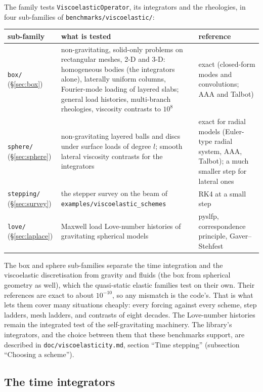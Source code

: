 \documentclass[11pt]{article}
\numberwithin{equation}{section}
\newcommand{\code}[1]{\texttt{#1}}
\begin{document}
The family tests \code{ViscoelasticOperator}, its integrators and the
rheologies, in four sub-families of \code{benchmarks/viscoelastic/}:
\begin{center}
\small
\begin{tabular}{@{}lP{8.2cm}P{4.2cm}@{}}
\toprule
sub-family & what is tested & reference \\
\midrule
\code{box/} (\S\ref{sec:box}) & non-gravitating, solid-only problems on
rectangular meshes, 2-D and 3-D: homogeneous bodies (the integrators
alone), laterally uniform columns, Fourier-mode loading of layered slabs;
general load histories, multi-branch rheologies, viscosity contrasts to
$10^8$ & exact (closed-form modes and convolutions; AAA and Talbot) \\
\code{sphere/} (\S\ref{sec:sphere}) & non-gravitating layered balls and
discs under surface loads of degree $l$; smooth lateral viscosity
contrasts for the integrators & exact for radial models (Euler-type radial
system, AAA, Talbot); a much smaller step for lateral ones \\
\code{stepping/} (\S\ref{sec:survey}) & the stepper survey on the beam of
\code{examples/viscoelastic\_schemes} & RK4 at a small step \\
\code{love/} (\S\ref{sec:laplace}) & Maxwell load Love-number histories of
gravitating spherical models & pyslfp, correspondence principle,
Gaver--Stehfest \\
\bottomrule
\end{tabular}
\end{center}
The box and sphere sub-families separate the time integration and the
viscoelastic discretisation from gravity and fluids (the box from
spherical geometry as well), which the quasi-static elastic families
test on their own. Their references are exact to about $10^{-10}$, so any
mismatch is the code's. That is what lets them cover many situations
cheaply: every forcing against every scheme, step ladders, mesh ladders,
and contrasts of eight decades. The Love-number histories remain the
integrated test of the self-gravitating machinery. The library's
integrators, and the choice between them that these benchmarks support,
are described in \code{doc/viscoelasticity.md}, section ``Time stepping''
(subsection ``Choosing a scheme'').

\subsection{The time integrators}
\label{sec:steppers}
\end{document}
